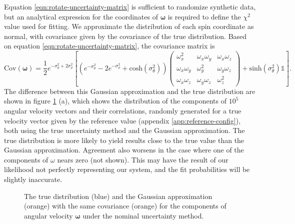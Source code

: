 \documentclass{aastex631}
\newcommand{\parens}[1]{\left( #1 \right)}
\newcommand{\brackets}[1]{\left[ #1 \right]}
\begin{document}
Equation \ref{eqn:rotate-uncertainty-matrix} is sufficient to randomize synthetic data, but an analytical expression for the coordinates of $\bm \omega$ is required to define the $\chi^2$ value used for fitting. We approximate the distribution of each spin coordinate as normal, with covariance given by the covariance of the true distribution. Based on equation \ref{eqn:rotate-uncertainty-matrix}, the covariance matrix is
\begin{equation}
\text{Cov}(\bm \omega) = \frac{1}{2}e^{-\sigma_\theta^2 + 2 \sigma_\rho^2}\brackets{\parens{e^{-\sigma_\theta^2}-2e^{-\sigma_\rho^2}+\textrm{cosh}(\sigma_\theta^2)} \parens{\begin{array}{ccc}
\omega_x^2 & \omega_x \omega_y& \omega_x \omega_z\\
\omega_x \omega_y & \omega_y^2 & \omega_y \omega_z\\
\omega_x \omega_z & \omega_y \omega_z& \omega_z^2
\end{array}} +  \mathrm{sinh}(\sigma_\theta^2) \mathds{1}}.
\label{eqn:rotate-uncertainty-var}
\end{equation}
The difference between this Gaussian approximation and the true distribution are shown in figure \ref{fig:nominal-spin-distro} (a), which shows the distribution of the components of $10^5$ angular velocity vectors and their correlations, randomly generated for a true velocity vector given by the reference value (appendix \ref{app:reference-config}), both using the true uncertainty method and the Gaussian approximation. The true distribution is more likely to yield results close to the true value than the Gaussian approximation. Agreement also worsens in the case where one of the components of $\omega$ nears zero (not shown). This may have the result of our likelihood not perfectly representing our system, and the fit probabilities will be slightly inaccurate.
\begin{figure}
  \centering
  \caption{The true distribution (blue) and the Gaussian approximation (orange) with the same covariance (orange)  for the components of angular velocity $\bm \omega$ under the nominal uncertainty method.}
  \label{fig:nominal-spin-distro}
\end{figure}
\end{document}
